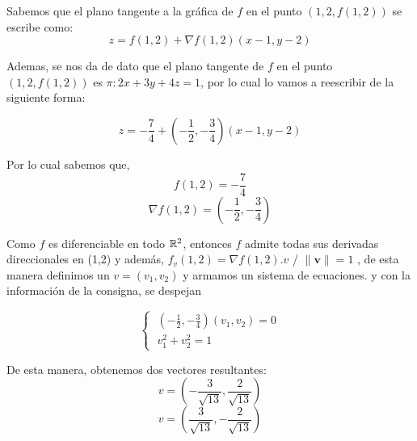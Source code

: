 
\begin{solution}
Sabemos que el plano tangente a la gráfica de $f$ en el punto $(1,2,f(1,2))$ se escribe como:
\[   
    z= f(1,2) + \nabla f(1,2)(x-1,y-2)
\]

Ademas, se nos da de dato que el plano tangente de $f$ en el punto $(1,2,f(1,2))$ es $\pi:2x+3y+4z=1$, por lo cual lo vamos a reescribir de la siguiente forma:

\[   
z= -\frac{7}{4} + (-\frac{1}{2},-\frac{3}{4})(x-1,y-2)
\]

Por lo cual sabemos que,
\[   
f(1,2)=-\frac{7}{4}
\]
\[
 \nabla f(1,2)=(-\frac{1}{2},-\frac{3}{4})
\]


    Como   $f$ es diferenciable en todo $\mathbb{R}^2$, entonces $f$ admite todas sus derivadas direccionales en (1,2) y además, $f_v(1,2)=\nabla f(1,2).v$ / $\|\mathbf{v}\|=1$ , de esta manera definimos un $v=(v_1,v_2)$ y armamos un sistema de ecuaciones.
     y con la información de la consigna, se despejan
     
    \[\begin{cases}
            \;(-\frac{1}{2},-\frac{3}{4})(v_1,v_2)=0 \\[5pt]
            \;v_1^2+v_2^2=1
        \end{cases}
    \]
    
    De esta manera, obtenemos dos vectores resultantes:
    \[
    v=(-\frac{3}{\sqrt{13}},\frac{2}{\sqrt{13}})
    \]
     \[
    v=(\frac{3}{\sqrt{13}},-\frac{2}{\sqrt{13}})
    \]
    

\newpage
\end{solution}

